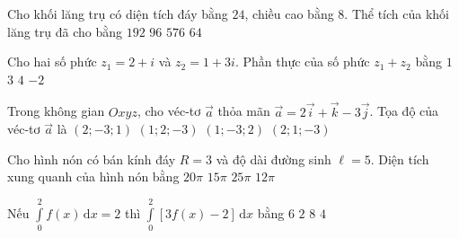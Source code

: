 \begin{ex}%
	Cho khối lăng trụ có diện tích đáy bằng $24$, chiều cao bằng $8$. Thể tích của khối lăng trụ đã cho bằng
	\choice
	{\True $192$}
	{$96$}
	{$576$}
	{$64$}
\end{ex}

\begin{ex}%
	Cho hai số phức $z_1=2+i$ và $z_2=1+3i$. Phần thực của số phức $z_1+z_2$ bằng
	\choice
	{$1$}
	{\True $3$}
	{$4$}
	{$-2$}
\end{ex}

\begin{ex}%
	Trong không gian $Oxyz$, cho véc-tơ $\overrightarrow{a}$ thỏa mãn $\overrightarrow{a}=2\overrightarrow{i}+\overrightarrow{k}-3\overrightarrow{j}$. Tọa độ của véc-tơ $\overrightarrow{a}$ là
	\choice
	{\True $\left(2;-3;1\right)$}
	{$\left(1;2;-3\right)$}
	{$\left(1;-3;2\right)$}
	{$\left(2;1;-3\right)$}
\end{ex}

\begin{ex}%
	Cho hình nón có bán kính đáy $R=3$ và độ dài đường sinh $\ell=5$. Diện tích xung quanh của hình nón bằng
	\choice
	{$20\pi$}
	{\True $15\pi$}
	{$25\pi$}
	{$12\pi$}
\end{ex}

\begin{ex}%
	Nếu $\displaystyle\int\limits_0^2f(x)\mathrm{\,d}x=2$ thì $\displaystyle\int\limits_0^2\left[3f(x)-2\right]\mathrm{\,d}x$ bằng
	\choice
	{$6$}
	{\True $2$}
	{$8$}
	{$4$}
\end{ex}

